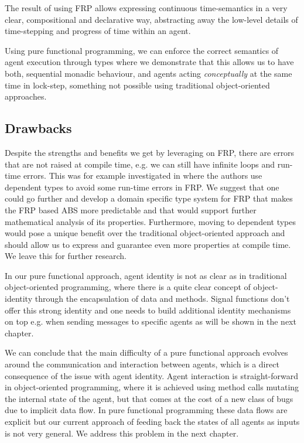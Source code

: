 The result of using FRP allows expressing continuous time-semantics in a very clear, compositional and declarative way, abstracting away the low-level details of time-stepping and progress of time within an agent.

Using pure functional programming, we can enforce the correct semantics of agent execution through types where we demonstrate that this allows us to have both, sequential monadic behaviour, and agents acting \textit{conceptually} at the same time in lock-step, something not possible using traditional object-oriented approaches.

\subsection{Drawbacks}
Despite the strengths and benefits we get by leveraging on FRP, there are errors that are not raised at compile time, e.g. we can still have infinite loops and run-time errors. This was for example investigated in \cite{sculthorpe_safe_2009} where the authors use dependent types to avoid some run-time errors in FRP. We suggest that one could go further and develop a domain specific type system for FRP that makes the FRP based ABS more predictable and that would support further mathematical analysis of its properties. Furthermore, moving to dependent types would pose a unique benefit over the traditional object-oriented approach and should allow us to express and guarantee even more properties at compile time. We leave this for further research.

In our pure functional approach, agent identity is not as clear as in traditional object-oriented programming, where there is a quite clear concept of object-identity through the encapsulation of data and methods. Signal functions don't offer this strong identity and one needs to build additional identity mechanisms on top e.g. when sending messages to specific agents as will be shown in the next chapter.

We can conclude that the main difficulty of a pure functional approach evolves around the communication and interaction between agents, which is a direct consequence of the issue with agent identity. Agent interaction is straight-forward in object-oriented programming, where it is achieved using method calls mutating the internal state of the agent, but that comes at the cost of a new class of bugs due to implicit data flow. In pure functional programming these data flows are explicit but our current approach of feeding back the states of all agents as inputs is not very general. We address this problem in the next chapter.

